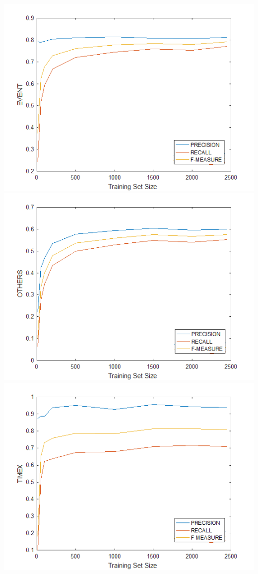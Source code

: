\documentclass[letterpaper, 10 pt, conference]{ieeeconf}
\begin{document}
\includegraphics[scale = 0.65]{f4.png}
\includegraphics[scale = 0.65]{f5.png}
\includegraphics[scale = 0.65]{f6.png}
\end{document}

